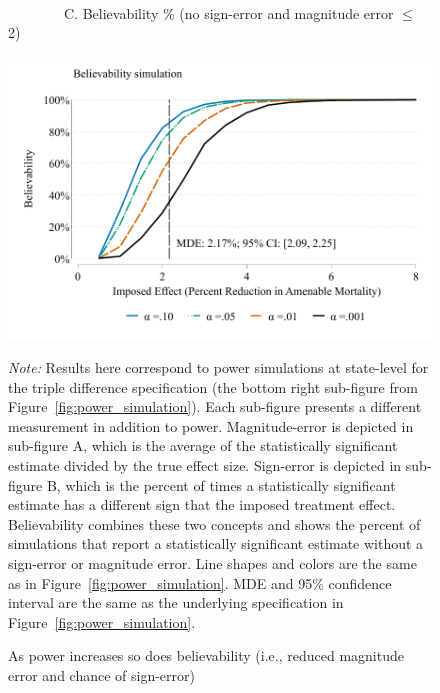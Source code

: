 \documentclass[12pt]{article}%
\begin{document}
\begin{figure}[]
\begin{minipage}{\linewidth}
\begin{minipage}{.49\linewidth}
    \end{minipage}\centering
    ~\\
    \begin{minipage}{.49\linewidth}
            \begin{flushleft}
            ~~~~~~~~C. Believability \% (no sign-error and magnitude error $\leq$ 2)\\
        \end{flushleft}
      \includegraphics[width=\linewidth]{../output/figures/believability_st_ddd_ln_amen_none_cluster_state_weight_attpop_controls_yes_preperiod_2001_2010.pdf}  
    \end{minipage}
\begin{justify}
                {\footnotesize
                    \emph{Note:} 
                Results here correspond to power simulations at state-level for the triple difference specification (the bottom right sub-figure from Figure~\ref{fig:power_simulation}). 
                Each sub-figure presents a different measurement in addition to power.
                Magnitude-error is depicted in sub-figure A, which is the average of the statistically significant estimate divided by the true effect size. 
                Sign-error is depicted in sub-figure B, which is the percent of times a statistically significant estimate has a different sign that the imposed treatment effect. 
                Believability combines these two concepts and shows the percent of simulations that report a statistically significant estimate without a sign-error or magnitude error. 
                Line shapes and colors are the same as in Figure~\ref{fig:power_simulation}.  
                MDE and 95\% confidence interval are the same as the underlying specification in Figure~\ref{fig:power_simulation}.  
                \par}
            \end{justify}
      \end{minipage}
    \caption{As power increases so does believability (i.e., reduced magnitude error and chance of sign-error)}
       \label{fig:believe_simulation}
\end{figure}
\end{document}
